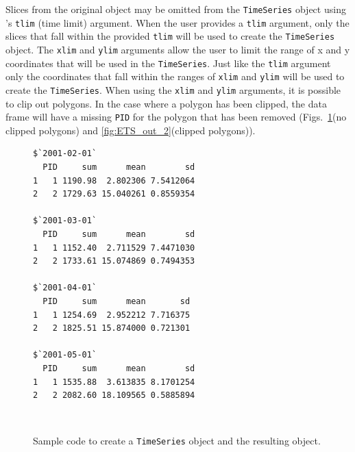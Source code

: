 \documentclass[11pt]{report}
\begin{document}
Slices from the original  object may be omitted from the \lstinline{TimeSeries} object using 's \lstinline{tlim} (time limit) argument.
When the user provides a \lstinline{tlim} argument, only the slices that fall within the provided \lstinline{tlim} will be used to create the \lstinline{TimeSeries} object.
The \lstinline{xlim} and \lstinline{ylim} arguments allow the user to limit the range of x and y coordinates that will be used in the \lstinline{TimeSeries}.
Just like the \lstinline{tlim} argument only the coordinates that fall within the ranges of \lstinline{xlim} and \lstinline{ylim} will be used to create the \lstinline{TimeSeries}. 
When using the \lstinline{xlim} and \lstinline{ylim} arguments, it is possible to clip out polygons.
In the case where a polygon has been clipped, the data frame will have a missing \lstinline{PID} for the polygon that has been removed (Figs.~\ref{fig:ETS_out_1}(no clipped polygons) and \ref{fig:ETS_out_2}(clipped polygons)).

\begin{figure}
  \centering
  \begin{minipage}[b]{0.56\linewidth}
    \centering
    
  \end{minipage}\hfill
  \begin{minipage}[b]{0.40\linewidth}
    \centering
    \begin{lstlisting}[basicstyle=\ttfamily\footnotesize{}]
$`2001-02-01`
  PID     sum      mean        sd
1   1 1190.98  2.802306 7.5412064
2   2 1729.63 15.040261 0.8559354

$`2001-03-01`
  PID     sum      mean        sd
1   1 1152.40  2.711529 7.4471030
2   2 1733.61 15.074869 0.7494353

$`2001-04-01`
  PID     sum      mean       sd
1   1 1254.69  2.952212 7.716375
2   2 1825.51 15.874000 0.721301

$`2001-05-01`
  PID     sum      mean        sd
1   1 1535.88  3.613835 8.1701254
2   2 2082.60 18.109565 0.5885894
    \end{lstlisting}  
  \end{minipage}\\
  \begin{minipage}[t]{0.56\linewidth}
    \centering

  \end{minipage}\hfill
  \begin{minipage}[t]{0.40\linewidth}
    \centering
  \end{minipage}
  \caption{
    Sample code to create a \texttt{TimeSeries} object and the resulting object.
  }
  \label{fig:ETS_out_1}
\end{figure}
\end{document}
